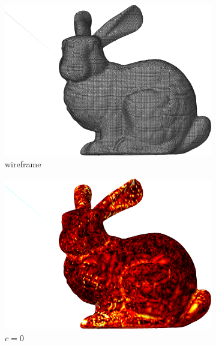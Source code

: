 \begin{figure}[ht]
	\begin{subfigure}[b]{0.32\linewidth}
		\includegraphics[width=\linewidth]
		{data/acquired_meshes/bun_zipper_edited_r1_n4_v256_wireframe.png}
		\caption{wireframe}\label{fig:bun.a}
	\end{subfigure}
	\begin{subfigure}[b]{0.32\linewidth}
		\includegraphics[width=\linewidth]
		{data/acquired_meshes/bun_zipper_edited_r1_n4_v256_funcvals_0iter.png}
		\caption{$c=0$}\label{fig:bun.b}
	\end{subfigure}
	\begin{subfigure}[b]{0.32\linewidth}

\end{subfigure}
\end{figure}
